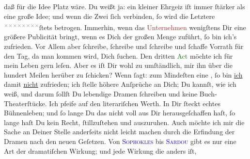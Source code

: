                daß für die Idee Platz wäre. Du weißt ja: ein kleiner Ehrgeiz iſt immer ſtärker als
               eine große Idee; und wenn die Zwei ſich verbinden, ſo wird die Letztere \substVorne{}\textsuperscript{\textcolor{gray}{×}\-\textcolor{gray}{×}\-\textcolor{gray}{×}\-\textcolor{gray}{×}\-\textcolor{gray}{×}\-\textcolor{gray}{×}\-\textcolor{gray}{×}\-\textcolor{gray}{×}}\substDazwischen{}ſtets\substHinten{} betrogen. Immerhin, wenn das \textcolor{brown}{Unternehmen}{} wenigſtens Dir eine größere Publicität bringt,
               wenn es Dich der großen Menge zuführt, ſo bin ich’s zufrieden. Vor Allem aber
               ſchreibe, ſchreibe und ſchreibe und ſchaffe Vorrath für den Tag, da man kommen wird,
               Dich ſuchen. Den dritten \textcolor{green}{Act}{} möchte ich für mein Leben gern leſen. Aber es iſt Dir
               wohl zu umſtändlich, mir ihn über die hundert Meilen herüber zu ſchicken? Wenn \textsc{\label{K_L02668-33v}\label{K_L02668-33h}} ſagt: zum Mindeſten eine \label{K_L02668-8v}\label{K_L02668-8h}, ſo bin \uline{ich} damit \uline{nicht} zufrieden; ich ſtelle höhere Anſprüche an Dich; Du kannſt, wie ich
               weiß, und darum ſollſt Du {\pb}lebendige Dramen
               ſchreiben und keine Buch-Theaterſtücke. Ich pfeife auf den literariſchen Werth. In
               Dir ſteckt echtes Bühnenleben; und ſo lange Du das nicht voll aus Dir
               herausgeſchaffen haſt, ſo lange haſt Du kein Recht, ſtillzuſtehen und auszuruhen.
               Auch möchte ich mir die Sache an Deiner Stelle anderſeits nicht leicht machen durch
               die Erfindung der Dramen nach den neuen Geſetzen. Von \textsc{\textcolor{blue}{Sophokles}{}\ledrightnote{\textcolor{blue}{Sophokles}}} bis \textsc{\textcolor{blue}{Sardou}{}\ledrightnote{\textcolor{blue}{Victorien Sardou}}} gibt es nur eine Art der dramatiſchen Wirkung; und jede Wirkung die anders iſt,
